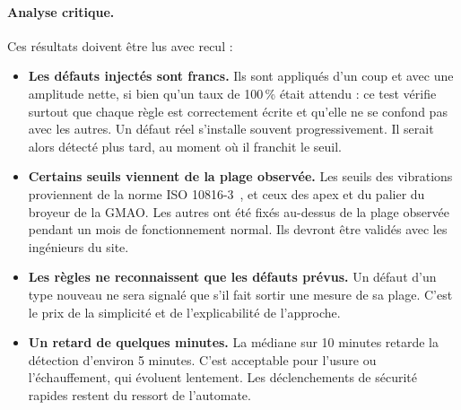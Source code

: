 \paragraph{Analyse critique.} Ces résultats doivent être lus avec recul :
\begin{itemize}
  \item \textbf{Les défauts injectés sont francs.} Ils sont appliqués d'un coup et avec une amplitude nette, si bien qu'un taux de 100\,\% était attendu : ce test vérifie surtout que chaque règle est correctement écrite et qu'elle ne se confond pas avec les autres. Un défaut réel s'installe souvent progressivement. Il serait alors détecté plus tard, au moment où il franchit le seuil.
  \item \textbf{Certains seuils viennent de la plage observée.} Les seuils des vibrations proviennent de la norme ISO 10816-3~\cite{iso10816}, et ceux des apex et du palier du broyeur de la GMAO. Les autres ont été fixés au-dessus de la plage observée pendant un mois de fonctionnement normal. Ils devront être validés avec les ingénieurs du site.
  \item \textbf{Les règles ne reconnaissent que les défauts prévus.} Un défaut d'un type nouveau ne sera signalé que s'il fait sortir une mesure de sa plage. C'est le prix de la simplicité et de l'explicabilité de l'approche.
  \item \textbf{Un retard de quelques minutes.} La médiane sur 10 minutes retarde la détection d'environ 5 minutes. C'est acceptable pour l'usure ou l'échauffement, qui évoluent lentement. Les déclenchements de sécurité rapides restent du ressort de l'automate.
\end{itemize}
